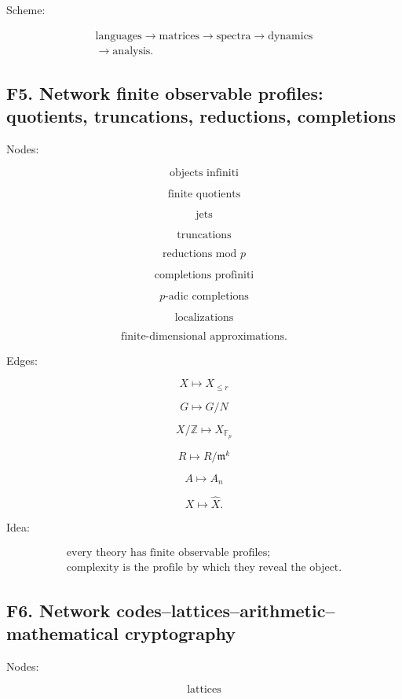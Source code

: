\documentclass[11pt]{article}
\begin{document}
Scheme:

\[
\begin{gathered}
\text{languages} \to \text{matrices} \to \text{spectra} \to \text{dynamics} \\
\to \text{analysis}.
\end{gathered}
\]



\subsection{F5. Network finite observable profiles: quotients, truncations, reductions, completions}

Nodes:

\[
\text{objects infiniti}
\]

\[
\text{finite quotients}
\]

\[
\text{jets}
\]

\[
\text{truncations}
\]

\[
\text{reductions mod }p
\]

\[
\text{completions profiniti}
\]

\[
p\text{-adic completions}
\]

\[
\text{localizations}
\]

\[
\text{finite-dimensional approximations}.
\]

Edges:

\[
X\mapsto X_{\le r}
\]

\[
G\mapsto G/N
\]

\[
X/\mathbb Z\mapsto X_{\mathbb F_p}
\]

\[
R\mapsto R/\mathfrak m^k
\]

\[
A\mapsto A_n
\]

\[
X\mapsto \widehat X.
\]

Idea:

\[
\begin{gathered}
\text{every theory has finite observable profiles;}\\
\text{complexity is the profile by which they reveal the object.}
\end{gathered}
\]



\subsection{F6. Network codes--lattices--arithmetic--mathematical cryptography}

Nodes:

\[
\text{lattices}
\]
\end{document}
